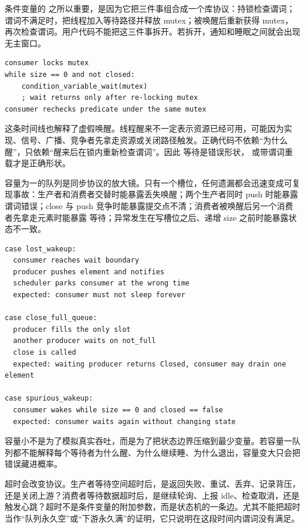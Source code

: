 条件变量的  之所以重要，是因为它把三件事组合成一个库协议：持锁检查谓词；谓词不满足时，把线程加入等待路径并释放 mutex；被唤醒后重新获得 mutex，再次检查谓词。用户代码不能把这三件事拆开。若拆开，通知和睡眠之间就会出现无主窗口。

\begin{lstlisting}[numbers=none,caption={正确等待：谓词和 wait 绑定}]
consumer locks mutex
while size == 0 and not closed:
    condition_variable_wait(mutex)
    ; wait returns only after re-locking mutex
consumer rechecks predicate under the same mutex
\end{lstlisting}

这条时间线也解释了虚假唤醒。线程醒来不一定表示资源已经可用，可能因为实现、信号、广播、竞争者先拿走资源或关闭路径触发。正确代码不依赖“为什么醒”，只依赖“醒来后在锁内重新检查谓词”。因此  等待是错误形状， 或带谓词重载才是正确形状。

容量为一的队列是同步协议的放大镜。只有一个槽位，任何遗漏都会迅速变成可复现事故：生产者和消费者交替时能暴露丢失唤醒；两个生产者同时 push 时能暴露谓词错误；close 与 push 竞争时能暴露提交点不清；消费者被唤醒后另一个消费者先拿走元素时能暴露  等待；异常发生在写槽位之后、递增 size 之前时能暴露状态不一致。

\begin{lstlisting}[numbers=none,caption={容量一队列的故障注入序列}]
case lost_wakeup:
  consumer reaches wait boundary
  producer pushes element and notifies
  scheduler parks consumer at the wrong time
  expected: consumer must not sleep forever

case close_full_queue:
  producer fills the only slot
  another producer waits on not_full
  close is called
  expected: waiting producer returns Closed, consumer may drain one element

case spurious_wakeup:
  consumer wakes while size == 0 and closed == false
  expected: consumer waits again without changing state
\end{lstlisting}

容量小不是为了模拟真实吞吐，而是为了把状态边界压缩到最少变量。若容量一队列都不能解释每个等待者为什么醒、为什么继续睡、为什么退出，容量变大只会把错误藏进概率。

超时会改变协议。生产者等待空间超时后，是返回失败、重试、丢弃、记录背压，还是关闭上游？消费者等待数据超时后，是继续轮询、上报 idle、检查取消，还是触发心跳？超时不是条件变量的附加参数，而是状态机的一条边。尤其不能把超时当作“队列永久空”或“下游永久满”的证明，它只说明在这段时间内谓词没有满足。

